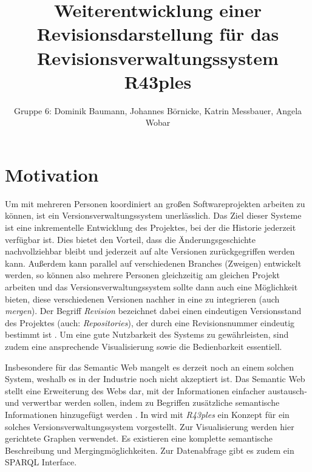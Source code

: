 \documentclass[color]{tudbook}
\begin{document}
\author{Gruppe 6: Dominik Baumann, Johannes Börnicke, Katrin Messbauer, Angela Wobar}
\title{Weiterentwicklung einer Revisionsdarstellung für das Revisionsverwaltungssystem R43ples}
\maketitle

\tableofcontents

\chapter{Motivation}
Um mit mehreren Personen koordiniert an großen Softwareprojekten arbeiten zu können, ist ein Versionsverwaltungssystem unerlässlich. Das Ziel dieser Systeme ist eine inkrementelle Entwicklung des Projektes, bei der die Historie jederzeit verfügbar ist. Dies bietet den Vorteil, dass die Änderungsgeschichte nachvollziehbar bleibt und jederzeit auf alte Versionen zurückgegriffen werden kann. Außerdem kann parallel auf verschiedenen Branches (Zweigen) entwickelt werden, so können also mehrere Personen gleichzeitig am gleichen Projekt arbeiten und das Versionsverwaltungssystem sollte dann auch eine Möglichkeit bieten, diese verschiedenen Versionen nachher in eine zu integrieren (auch \textit{mergen}). Der Begriff \textit{Revision} bezeichnet dabei einen eindeutigen Versionsstand des Projektes (auch: \textit{Repositories}), der durch eine Revisionsnummer eindeutig bestimmt ist \cite{CAE}. Um eine gute Nutzbarkeit des Systems zu gewährleisten, sind zudem eine ansprechende Visualisierung sowie die Bedienbarkeit essentiell.

Insbesondere für das Semantic Web mangelt es derzeit noch an einem solchen System, weshalb es in der Industrie noch nicht akzeptiert ist. Das Semantic Web stellt eine Erweiterung des Webs dar, mit der Informationen einfacher austausch- und verwertbar werden sollen, indem zu Begriffen zusätzliche semantische Informationen hinzugefügt werden \cite{SemanticWeb}. In \cite{Graube} wird mit \textit{R43ples} ein Konzept für ein solches Versionsverwaltungssystem vorgestellt. Zur Visualisierung werden hier gerichtete Graphen verwendet. Es existieren eine komplette semantische Beschreibung und Mergingmöglichkeiten. Zur Datenabfrage gibt es zudem ein SPARQL Interface. 
\end{document}
